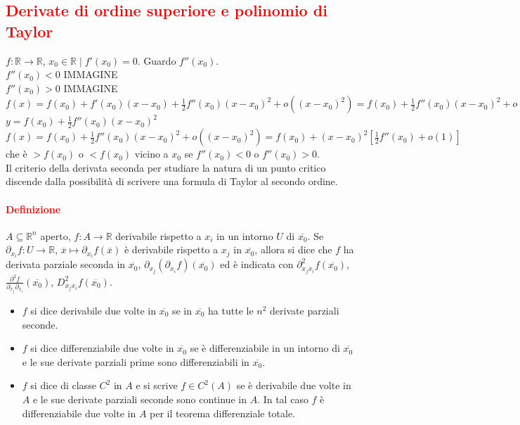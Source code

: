 \documentclass{article}
\newcommand{\R}{\mathbb{R}}
\begin{document}
\subsection{\textcolor{red}{Derivate di ordine superiore e polinomio di Taylor}}
$f: \R \rightarrow \R$, $x_0\in\R \mid f'(x_0)=0$. Guardo $f''(x_0)$.\\ 
$f''(x_0)<0$ IMMAGINE\\
$f''(x_0)>0$ IMMAGINE\\
$f(x)=f(x_0)+f'(x_0)(x-x_0)+\frac{1}{2}f''(x_0)(x-x_0)^2+o((x-x_0)^2)=f(x_0)+\frac{1}{2}f''(x_0)(x-x_0)^2+o((x-x_0)^2)$\\
$y=f(x_0)+\frac{1}{2}f''(x_0)(x-x_0)^2$\\
$f(x)=f(x_0)+\frac{1}{2}f''(x_0)(x-x_0)^2+o((x-x_0)^2)=f(x_0)+(x-x_0)^2\left[ \frac{1}{2} f''(x_0)+o(1) \right]$ che è $> f(x_0)$ o $< f(x_0)$ vicino a $x_0$ se $f''(x_0)< 0$ o $f''(x_0)>0$.\\
Il criterio della derivata seconda per studiare la natura di un punto critico discende dalla possibilità di scrivere una formula di Taylor al secondo ordine.

\paragraph{\textcolor{red}{Definizione}}
$A \subseteq \R^n$ aperto, $f: A \rightarrow \R$ derivabile rispetto a $x_i$ in un intorno $U$ di $\overline{x_0}$. Se $\partial_{x_i}f:U\rightarrow \R$, $\overline{x} \mapsto \partial_{x_i}f(\overline{x})$ è derivabile rispetto a $x_j$ in $\overline{x_0}$, allora si dice che $f$ ha derivata parziale seconda in $\overline{x_0}$, $\partial_{x_j}(\partial_{x_i}f)(\overline{x_0})$ ed è indicata con $\partial_{x_jx_i}^2f(\overline{x_0})$, $ \frac{\partial^2 f}{\partial_{x_j}\partial_{x_i}}(\overline{x_0})$, $D_{x_jx_i}^2f(\overline{x_0})$.
\begin{itemize}
    \item $f$ si dice derivabile due volte in $\overline{x_0} $ se in $\overline{x_0}$ ha tutte le $n^2$ derivate parziali seconde.
    \item $f$ si dice differenziabile due volte in $\overline{x_0}$ se è differenziabile in un intorno di $\overline{x_0}$ e le sue derivate parziali prime sono differenziabili in $\overline{x_0}$.
    \item $f$ si dice di classe $C^2$ in $A$ e si scrive $f \in C^2(A)$ se è derivabile due volte in $A$ e le sue derivate parziali seconde sono continue in $A$. In tal caso $f$ è differenziabile due volte in $A$ per il teorema differenziale totale. 
\end{itemize}
\end{document}
